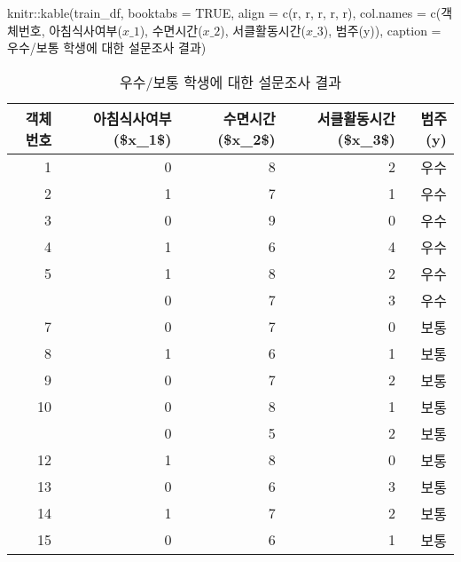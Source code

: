 \documentclass[
]{book}
\newenvironment{Shaded}{\begin{snugshade}}{\end{snugshade}}
\newcommand{\AttributeTok}[1]{\textcolor[rgb]{0.77,0.63,0.00}{#1}}
\newcommand{\ConstantTok}[1]{\textcolor[rgb]{0.00,0.00,0.00}{#1}}
\newcommand{\FunctionTok}[1]{\textcolor[rgb]{0.00,0.00,0.00}{#1}}
\newcommand{\NormalTok}[1]{#1}
\newcommand{\SpecialCharTok}[1]{\textcolor[rgb]{0.00,0.00,0.00}{#1}}
\newcommand{\StringTok}[1]{\textcolor[rgb]{0.31,0.60,0.02}{#1}}
\begin{document}
\begin{Shaded}
\begin{Highlighting}[]
\NormalTok{knitr}\SpecialCharTok{::}\FunctionTok{kable}\NormalTok{(train\_df, }\AttributeTok{booktabs =} \ConstantTok{TRUE}\NormalTok{,}
             \AttributeTok{align =} \FunctionTok{c}\NormalTok{(}\StringTok{\textquotesingle{}r\textquotesingle{}}\NormalTok{, }\StringTok{\textquotesingle{}r\textquotesingle{}}\NormalTok{, }\StringTok{\textquotesingle{}r\textquotesingle{}}\NormalTok{, }\StringTok{\textquotesingle{}r\textquotesingle{}}\NormalTok{, }\StringTok{\textquotesingle{}r\textquotesingle{}}\NormalTok{),}
             \AttributeTok{col.names =} \FunctionTok{c}\NormalTok{(}\StringTok{\textquotesingle{}객체번호\textquotesingle{}}\NormalTok{, }\StringTok{\textquotesingle{}아침식사여부($x\_1$)\textquotesingle{}}\NormalTok{, }\StringTok{\textquotesingle{}수면시간($x\_2$)\textquotesingle{}}\NormalTok{, }\StringTok{\textquotesingle{}서클활동시간($x\_3$)\textquotesingle{}}\NormalTok{, }\StringTok{\textquotesingle{}범주(y)\textquotesingle{}}\NormalTok{),}
             \AttributeTok{caption =} \StringTok{\textquotesingle{}우수/보통 학생에 대한 설문조사 결과\textquotesingle{}}\NormalTok{)}
\end{Highlighting}
\end{Shaded}

\begin{table}

\caption{\label{tab:binary-logistic-reg-train-data}우수/보통 학생에 대한 설문조사 결과}
\centering
\begin{tabular}[t]{rrrrr}
\toprule
객체번호 & 아침식사여부(\$x\_1\$) & 수면시간(\$x\_2\$) & 서클활동시간(\$x\_3\$) & 범주(y)\\
\midrule
1 & 0 & 8 & 2 & 우수\\
2 & 1 & 7 & 1 & 우수\\
3 & 0 & 9 & 0 & 우수\\
4 & 1 & 6 & 4 & 우수\\
5 & 1 & 8 & 2 & 우수\\
\addlinespace
6 & 0 & 7 & 3 & 우수\\
7 & 0 & 7 & 0 & 보통\\
8 & 1 & 6 & 1 & 보통\\
9 & 0 & 7 & 2 & 보통\\
10 & 0 & 8 & 1 & 보통\\
\addlinespace
11 & 0 & 5 & 2 & 보통\\
12 & 1 & 8 & 0 & 보통\\
13 & 0 & 6 & 3 & 보통\\
14 & 1 & 7 & 2 & 보통\\
15 & 0 & 6 & 1 & 보통\\
\bottomrule
\end{tabular}
\end{table}
\end{document}

